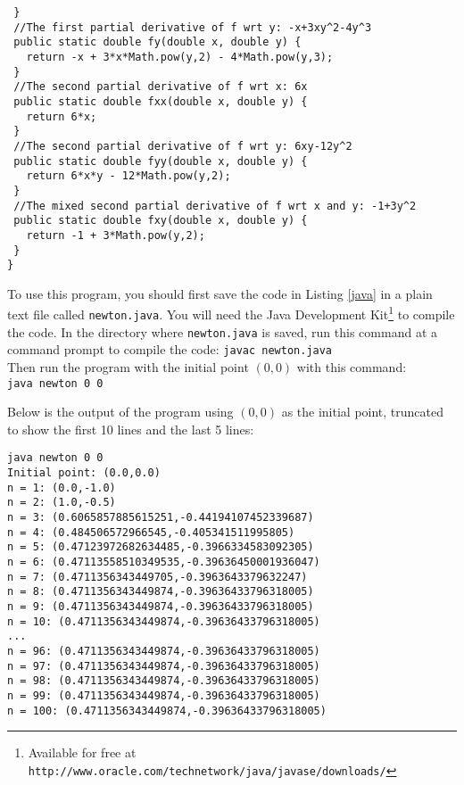 \begin{exmp}
\begin{lstlisting}
 }
 //The first partial derivative of f wrt y: -x+3xy^2-4y^3
 public static double fy(double x, double y) {
   return -x + 3*x*Math.pow(y,2) - 4*Math.pow(y,3);
 }
 //The second partial derivative of f wrt x: 6x
 public static double fxx(double x, double y) {
   return 6*x;
 }
 //The second partial derivative of f wrt y: 6xy-12y^2
 public static double fyy(double x, double y) {
   return 6*x*y - 12*Math.pow(y,2);
 }
 //The mixed second partial derivative of f wrt x and y: -1+3y^2
 public static double fxy(double x, double y) {
   return -1 + 3*Math.pow(y,2);
 }
}
\end{lstlisting}
\newpage
To use this program, you should first save the code in Listing \ref{java} in a plain text file called
\texttt{newton.java}. You will need the Java Development Kit\footnote{Available for free at
\texttt{http://www.oracle.com/technetwork/java/javase/downloads/}} to compile the code. In the directory where \texttt{newton.java} is
saved, run this command at a command prompt to compile the code: \texttt{javac newton.java}\\
Then run the program with the initial point $(0,0)$ with this command:\\\texttt{java newton 0 0}

Below is the output of the program using $(0,0)$ as the initial point, truncated to show the first 10 lines and
the last 5 lines:

\begin{verbatim}
java newton 0 0
Initial point: (0.0,0.0)
n = 1: (0.0,-1.0)
n = 2: (1.0,-0.5)
n = 3: (0.6065857885615251,-0.44194107452339687)
n = 4: (0.484506572966545,-0.405341511995805)
n = 5: (0.47123972682634485,-0.3966334583092305)
n = 6: (0.47113558510349535,-0.39636450001936047)
n = 7: (0.4711356343449705,-0.3963643379632247)
n = 8: (0.4711356343449874,-0.39636433796318005)
n = 9: (0.4711356343449874,-0.39636433796318005)
n = 10: (0.4711356343449874,-0.39636433796318005)
...
n = 96: (0.4711356343449874,-0.39636433796318005)
n = 97: (0.4711356343449874,-0.39636433796318005)
n = 98: (0.4711356343449874,-0.39636433796318005)
n = 99: (0.4711356343449874,-0.39636433796318005)
n = 100: (0.4711356343449874,-0.39636433796318005)
\end{verbatim}


\end{exmp}
